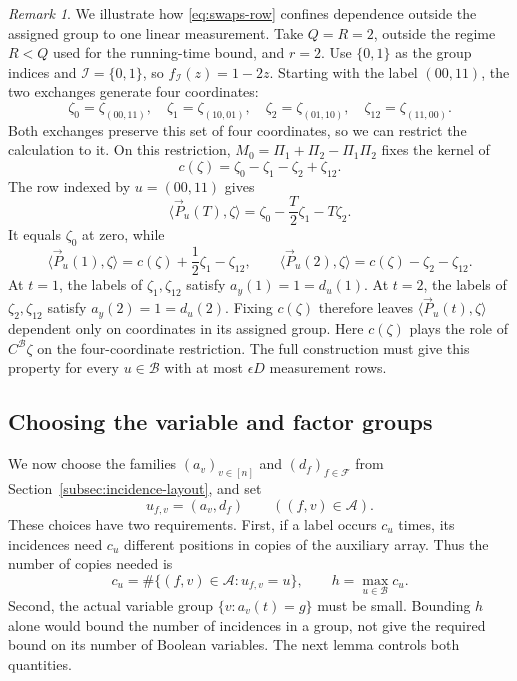 \documentclass[11pt,reqno]{amsart}
\numberwithin{equation}{section}
\theoremstyle{definition}\newtheorem{definition}[theorem]{Definition}
\theoremstyle{remark}\newtheorem{remark}[theorem]{Remark}
\begin{document}
\begin{remark}
We illustrate how \eqref{eq:swaps-row} confines dependence outside the
assigned group to one linear measurement. Take $Q=R=2$, outside the
regime $R<Q$ used for the running-time bound, and $r=2$. Use
$\{0,1\}$ as the group indices and $\mathcal I=\{0,1\}$, so
$f_{\mathcal I}(z)=1-2z$. Starting with the label $(00,11)$, the
two exchanges generate four coordinates:
\[
 \zeta_0=\zeta_{(00,11)},\quad \zeta_1=\zeta_{(10,01)},\quad
 \zeta_2=\zeta_{(01,10)},\quad \zeta_{12}=\zeta_{(11,00)}.
\]
Both exchanges preserve this set of four coordinates, so we can
restrict the calculation to it. On this restriction,
$M_0=\Pi_1+\Pi_2-\Pi_1\Pi_2$ fixes the kernel of
\[
 c(\zeta)=\zeta_0-\zeta_1-\zeta_2+\zeta_{12}.
\]
The row indexed by $u=(00,11)$ gives
\[
 \langle \vec{P}_u(T), \zeta\rangle=\zeta_0-\frac T2\zeta_1-T\zeta_2.
\]
It equals $\zeta_0$ at zero, while
\[
 \langle \vec{P}_u(1), \zeta\rangle=c(\zeta)+\frac12\zeta_1-\zeta_{12},\qquad
 \langle \vec{P}_u(2), \zeta\rangle=c(\zeta)-\zeta_2-\zeta_{12}.
\]
At $t=1$, the labels of $\zeta_1,\zeta_{12}$ satisfy
$a_y(1)=1=d_u(1)$. At $t=2$, the labels of
$\zeta_2,\zeta_{12}$ satisfy $a_y(2)=1=d_u(2)$.
Fixing $c(\zeta)$ therefore leaves $\langle \vec{P}_u(t), \zeta\rangle$ dependent only on
coordinates in its assigned group. Here $c(\zeta)$ plays the role
of $C^{\mathcal B}\zeta$ on the four-coordinate restriction. The
full construction must give this property for every $u\in\mathcal B$
with at most $\epsilon D$ measurement rows.
\end{remark}

\subsection{Choosing the variable and factor groups}\label{subsec:choosing-labels}
We now choose the families $(a_v)_{v\in[n]}$ and
$(d_f)_{f\in\mathcal F}$ from
Section~\ref{subsec:incidence-layout}, and set
\[
 u_{f,v}=(a_v,d_f)\qquad((f,v)\in\mathcal A).
\]
These choices have two requirements. First, if a label occurs $c_u$
times, its incidences need $c_u$ different positions in copies of the
auxiliary array. Thus the number of copies needed is
\[
 c_u=\#\{(f,v)\in\mathcal A:u_{f,v}=u\},\qquad
 h=\max_{u\in\mathcal B}c_u.
\]
Second, the actual variable group $\{v:a_v(t)=g\}$ must be small.
Bounding $h$ alone would bound the number of incidences in a group,
not give the required bound on its number of Boolean variables.
The next lemma controls both quantities.
\end{document}

